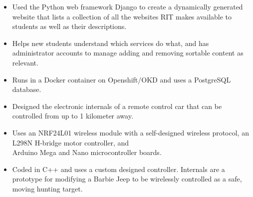 \vspace{1.5pt} %



{
\begin{itemize}
    \item Used the Python web framework Django to create a dynamically generated website that lists a collection of all the websites RIT makes available to students as well as their descriptions.
    \item Helps new students understand which services do what, and has administrator accounts to manage adding and removing sortable content as relevant.
    \item Runs in a Docker container on Openshift/OKD and uses a PostgreSQL database.
\end{itemize}
}
{}


{
\begin{itemize}
    \item Designed the electronic internals of a remote control car that can be controlled from up to 1 kilometer away.
    \item Uses an NRF24L01 wireless module with a self-designed wireless protocol, an L298N H-bridge motor controller, and \\ Arduino Mega and Nano microcontroller boards.
    \item Coded in C++ and uses a custom designed controller. Internals are a prototype for modifying a Barbie Jeep to be wirelessly controlled as a safe, moving hunting target.
\end{itemize}
}
{}


{}

{} \
